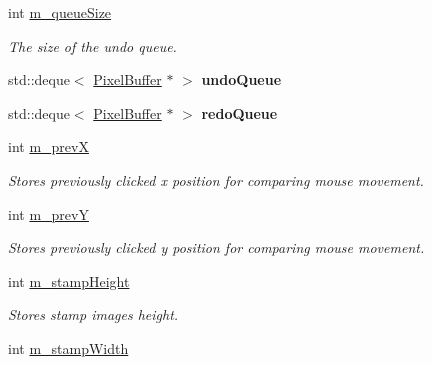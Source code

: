 \begin{DoxyCompactItemize}
\begin{tabbing}
\end{tabbing}\item 
int \hyperlink{classFlashPhotoApp_ae45bc3761686cbb4d5f9c01b048816c0}{m\+\_\+queue\+Size}\hypertarget{classFlashPhotoApp_ae45bc3761686cbb4d5f9c01b048816c0}{}\label{classFlashPhotoApp_ae45bc3761686cbb4d5f9c01b048816c0}

\begin{DoxyCompactList}\small\item\em The size of the undo queue. \end{DoxyCompactList}\item 
std\+::deque$<$ \hyperlink{classPixelBuffer}{Pixel\+Buffer} $\ast$ $>$ {\bfseries undo\+Queue}\hypertarget{classFlashPhotoApp_abdb0f4d46432039c14d5816abb019fa7}{}\label{classFlashPhotoApp_abdb0f4d46432039c14d5816abb019fa7}

\item 
std\+::deque$<$ \hyperlink{classPixelBuffer}{Pixel\+Buffer} $\ast$ $>$ {\bfseries redo\+Queue}\hypertarget{classFlashPhotoApp_a67142e2e575f5c63666b3e750279fd4f}{}\label{classFlashPhotoApp_a67142e2e575f5c63666b3e750279fd4f}

\item 
int \hyperlink{classFlashPhotoApp_a7552f6cf6441c53d020e5a0124031bcb}{m\+\_\+prevX}\hypertarget{classFlashPhotoApp_a7552f6cf6441c53d020e5a0124031bcb}{}\label{classFlashPhotoApp_a7552f6cf6441c53d020e5a0124031bcb}

\begin{DoxyCompactList}\small\item\em Stores previously clicked x position for comparing mouse movement. \end{DoxyCompactList}\item 
int \hyperlink{classFlashPhotoApp_a6a9759bdfbdf16bf0091f1694604a64a}{m\+\_\+prevY}\hypertarget{classFlashPhotoApp_a6a9759bdfbdf16bf0091f1694604a64a}{}\label{classFlashPhotoApp_a6a9759bdfbdf16bf0091f1694604a64a}

\begin{DoxyCompactList}\small\item\em Stores previously clicked y position for comparing mouse movement. \end{DoxyCompactList}\item 
int \hyperlink{classFlashPhotoApp_a2e397b37bfb3ea981efc795b7a2a9e9e}{m\+\_\+stamp\+Height}\hypertarget{classFlashPhotoApp_a2e397b37bfb3ea981efc795b7a2a9e9e}{}\label{classFlashPhotoApp_a2e397b37bfb3ea981efc795b7a2a9e9e}

\begin{DoxyCompactList}\small\item\em Stores stamp image\textquotesingle{}s height. \end{DoxyCompactList}\item 
int \hyperlink{classFlashPhotoApp_a7dab8bf3eb60e4c99310660c9c32f3a5}{m\+\_\+stamp\+Width}\hypertarget{classFlashPhotoApp_a7dab8bf3eb60e4c99310660c9c32f3a5}{}\label{classFlashPhotoApp_a7dab8bf3eb60e4c99310660c9c32f3a5}


\end{DoxyCompactItemize}
